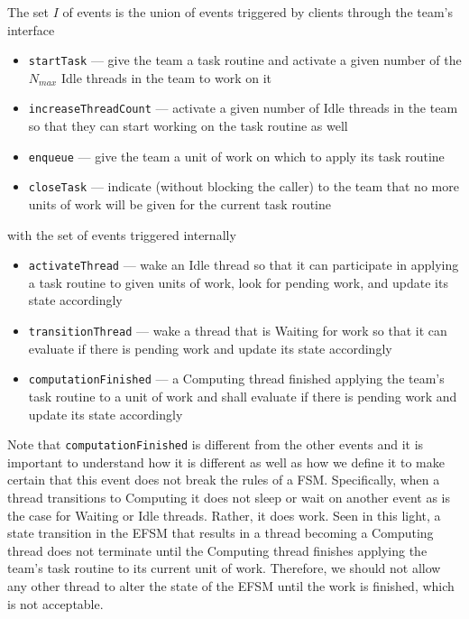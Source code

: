 \documentclass{article}
\newcommand{\taskroutine}        {task routine\xspace}
\begin{document}
The set $I$ of events is the union of events triggered by clients through the
team's interface
\begin{itemize}
\item{\texttt{startTask} --- give the team a \taskroutine and activate a given number of the
$N_{max}$ Idle threads in the team to work on it}
\item{\texttt{increaseThreadCount} --- activate a given number of Idle threads in the
team so that they can start working on the \taskroutine as well}
\item{\texttt{enqueue} --- give the team a unit of work on which to apply its
\taskroutine}
\item{\texttt{closeTask} --- indicate (without blocking the caller) to the team
that no more units of work will be given for the current \taskroutine}
\end{itemize}
with the set of events triggered internally
\begin{itemize}
\item{\texttt{activateThread} --- wake an Idle thread so that it can participate
in applying a \taskroutine to given units of work, look for pending work, and update its
state accordingly}
\item{\texttt{transitionThread} --- wake a thread that is Waiting for work so
that it can evaluate if there is pending work and update its state accordingly}
\item{\texttt{computationFinished} --- a Computing thread finished applying the team's
\taskroutine to a unit of work and shall evaluate if there is pending work and update
its state accordingly}
\end{itemize}

Note that \texttt{computationFinished} is different from the other events and it
is important to understand how it is different as well as how we define it to
make certain that this event does not break the rules of a FSM.  Specifically,
when a thread transitions to Computing it does not sleep or wait on another
event as is the case for Waiting or Idle threads.  Rather, it does work.  Seen
in this light, a state transition in the EFSM that results in a thread becoming
a Computing thread does not terminate until the Computing thread finishes
applying the team's \taskroutine to its current unit of work.  Therefore, we should not
allow any other thread to alter the state of the EFSM until the work is
finished, which is not acceptable.\\
\end{document}
